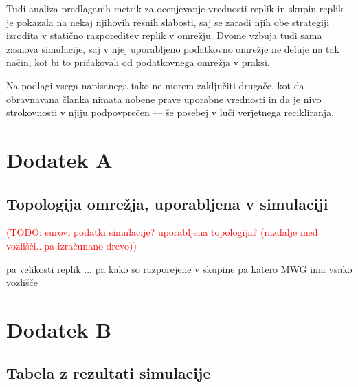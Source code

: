 \documentclass[a4paper, 12pt]{book}
\newcommand{\TODO}[1]{\textcolor{red}{(TODO: #1)}}
\begin{document}
Tudi analiza predlaganih metrik za ocenjevanje vrednosti replik in skupin
replik je pokazala na nekaj njihovih resnih slabosti, saj se zaradi njih
obe strategiji izrodita v statično razporeditev replik v omrežju. Dvome
vzbuja tudi sama zasnova simulacije, saj v njej uporabljeno podatkovno omrežje
ne deluje na tak način, kot bi to pričakovali od podatkovnega omrežja v
praksi.

Na podlagi vsega napisanega tako ne morem zaključiti drugače, kot da
obravnavana članka nimata nobene prave uporabne vrednosti in da je nivo
strokovnosti v njiju podpovprečen --- še posebej v luči verjetnega
recikliranja.



\chapter*{Dodatek A}
\section*{Topologija omrežja, uporabljena v simulaciji}

\TODO{surovi podatki simulacije? uporabljena topologija? (razdalje
med vozlišči...pa izračunano drevo)}

pa velikosti replik ...
pa kako so razporejene v skupine
pa katero MWG ima vsako vozlišče

\chapter*{Dodatek B}
\section*{Tabela z rezultati simulacije}
\end{document}
